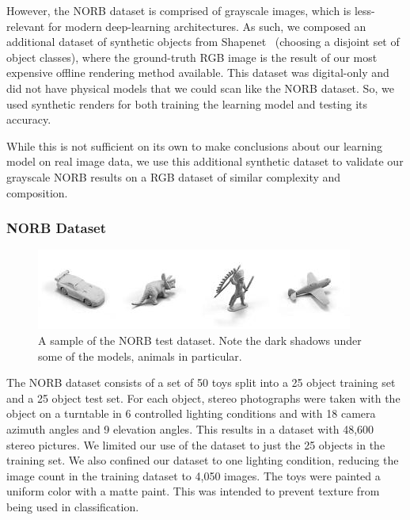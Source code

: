 \documentclass[10pt,twocolumn,letterpaper]{article}
\begin{document}
However, the NORB dataset is comprised of grayscale images, which is less-relevant for modern deep-learning architectures. As such, we composed an additional dataset of synthetic objects from Shapenet~\cite{DBLP:journals/corr/ChangFGHHLSSSSX15} (choosing a disjoint set of object classes), where the ground-truth RGB image is the result of our most expensive offline rendering method available. This dataset was digital-only and did not have physical models that we could scan like the NORB dataset. So, we used synthetic renders for both training the learning model and testing its accuracy.

While this is not sufficient on its own to make conclusions about our learning model on real image data, we use this additional synthetic dataset to validate our grayscale NORB results on a RGB dataset of similar complexity and composition. %

\subsubsection{NORB Dataset}\label{NORB-DATASET}
\begin{figure}[h!]
\centering
\includegraphics[width=1.0\columnwidth]{./assets/NORBTestSmall.png}
\caption{A sample of the NORB test dataset. Note the dark shadows under some of the models, animals in particular.}
\label{fig:norb-samples}
\end{figure}

The NORB dataset consists of a set of 50 toys split into a 25 object training set and a 25 object test set. For each object, stereo photographs were taken with the object on a turntable in 6 controlled lighting conditions and with 18 camera azimuth angles and 9 elevation angles. This results in a dataset with 48,600 stereo pictures.  We limited our use of the dataset to just the 25 objects in the training set. We also confined our dataset to one lighting condition, reducing the image count in the training dataset to 4,050 images. The toys were painted a uniform color with a matte paint. This was intended to prevent texture from being used in classification.
\end{document}
